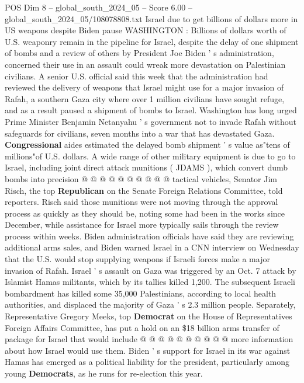 \begin{textsample}{POS Dim 8 – global\_south\_2024\_05 – Score 6.00 – global\_south\_2024\_05/108078808.txt}  \label{ex:f8_pos_224}
Israel due to get billions of dollars more in US weapons despite Biden pause WASHINGTON : Billions of dollars worth of U.S. weaponry remain in the pipeline for Israel, despite the delay of one shipment of bombs and a review of others by President Joe Biden ' s administration, concerned their use in an assault could wreak more devastation on Palestinian civilians.
A senior U.S. official said this week that the administration had reviewed the delivery of weapons that Israel might use for a major invasion of Rafah, a southern Gaza city where over 1 million civilians have sought refuge, and as a result paused a shipment of bombs to Israel.
Washington has long urged Prime Minister Benjamin Netanyahu ' s government not to invade Rafah without safeguards for civilians, seven months into a war that has devastated Gaza. \textbf{Congressional} aides estimated the delayed bomb shipment ' s value as"tens of millions"of U.S. dollars.
A wide range of other military equipment is due to go to Israel, including joint direct attack munitions ( JDAMS ), which convert dumb bombs into precision @ @ @ @ @ @ @ @ @ @ tactical vehicles, Senator Jim Risch, the top \textbf{Republican} on the Senate Foreign Relations Committee, told reporters.
Risch said those munitions were not moving through the approval process as quickly as they should be, noting some had been in the works since December, while assistance for Israel more typically sails through the review process within weeks.
Biden administration officials have said they are reviewing additional arms sales, and Biden warned Israel in a CNN interview on Wednesday that the U.S. would stop supplying weapons if Israeli forces make a major invasion of Rafah.
Israel ' s assault on Gaza was triggered by an Oct. 7 attack by Islamist Hamas militants, which by its tallies killed 1,200.
The subsequent Israeli bombardment has killed some 35,000 Palestinians, according to local health authorities, and displaced the majority of Gaza ' s 2.3 million people.
Separately, Representative Gregory Meeks, top \textbf{Democrat} on the House of Representatives Foreign Affairs Committee, has put a hold on an \$18 billion arms transfer of package for Israel that would include @ @ @ @ @ @ @ @ @ @ more information about how Israel would use them.
Biden ' s support for Israel in its war against Hamas has emerged as a political liability for the president, particularly among young \textbf{Democrats}, as he runs for re-election this year.

\end{textsample}
